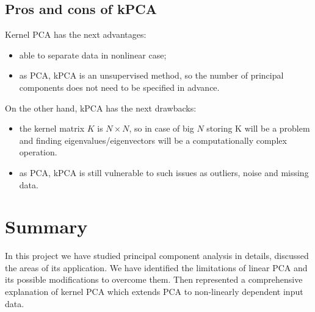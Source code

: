 \subsection{Pros and cons of kPCA}
Kernel PCA has the next advantages:

\begin{itemize}
	\item able to separate data in nonlinear case;
	\item as PCA, kPCA is an unsupervised method, so the number of principal components does not need to be specified in advance.
\end{itemize}
On the other hand, kPCA has the next drawbacks:

\begin{itemize}
	\item the kernel matrix $K$ is $N \times N$, so in case of big $N$ storing K will be a problem and finding eigenvalues/eigenvectors will be a computationally complex operation. 
	\item as PCA, kPCA is still vulnerable to such issues as outliers, noise and missing data.
\end{itemize}


\section{Summary}
In this project we have studied principal component analysis in details, discussed the areas of its application. We have identified the limitations of linear PCA and its possible modifications to overcome them. Then represented a comprehensive explanation of kernel PCA which extends PCA to non-linearly dependent input data. 

